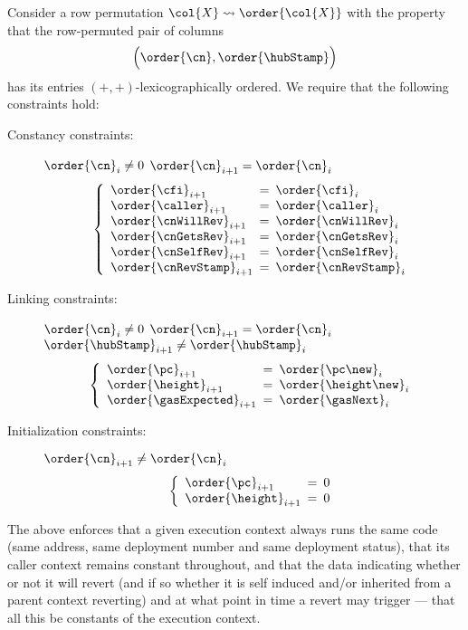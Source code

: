 Consider a row permutation $\col{X}\rightsquigarrow\order{\col{X}}$ with the property that the row-permuted pair of columns
\[
	\Big( \order{\cn} , \order{\hubStamp} \Big)
\]
has its entries $(+,+)$-lexicographically ordered. We require that the following constraints hold:
\begin{description}
	\item[Constancy constraints:] 
		\If $\order{\cn}_{i} \neq 0$ \et $\order{\cn}_{i + 1} = \order{\cn}_{i}$ \Then
		\[
			\left\{ \begin{array}{lcl}
				\order{\cfi          } _{i + 1} & \!\!\! = \!\!\! & \order{\cfi        } _{i} \\
				\order{\caller       } _{i + 1} & \!\!\! = \!\!\! & \order{\caller     } _{i} \\
				\order{\cnWillRev    } _{i + 1} & \!\!\! = \!\!\! & \order{\cnWillRev  } _{i} \\
				\order{\cnGetsRev    } _{i + 1} & \!\!\! = \!\!\! & \order{\cnGetsRev  } _{i} \\
				\order{\cnSelfRev    } _{i + 1} & \!\!\! = \!\!\! & \order{\cnSelfRev  } _{i} \\
				\order{\cnRevStamp   } _{i + 1} & \!\!\! = \!\!\! & \order{\cnRevStamp } _{i} \\
			\end{array} \right.
		\]
	\item[Linking constraints:] 
		\If $\order{\cn}_{i} \neq 0$ \et $\order{\cn}_{i + 1} = \order{\cn}_{i}$ \et $\order{\hubStamp}_{i + 1} \neq \order{\hubStamp}_{i}$ \Then
		\[
			\left\{ \begin{array}{lcl}
				\order{\pc           } _{i + 1} & \!\!\! = \!\!\! & \order{\pc\new     } _{i} \\
				\order{\height       } _{i + 1} & \!\!\! = \!\!\! & \order{\height\new } _{i} \\
				\order{\gasExpected  } _{i + 1} & \!\!\! = \!\!\! & \order{\gasNext    } _{i} \\
			\end{array} \right.
		\]
	\item[Initialization constraints:] 
		\If $\order{\cn}_{i + 1} \neq \order{\cn}_{i}$ \Then
		\[
			\left\{ \begin{array}{lcl}
				\order{\pc           } _{i + 1} & \!\!\! = \!\!\! & 0 \\
				\order{\height       } _{i + 1} & \!\!\! = \!\!\! & 0 \\
			\end{array} \right.
		\]
\end{description}
The above enforces that a given execution context always runs the same code (same address, same deployment number and same deployment status), that its caller context remains constant throughout, and that the data indicating whether or not it will revert (and if so whether it is self induced and/or inherited from a parent context reverting) and at what point in time a revert may trigger --- that all this be constants of the execution context.
